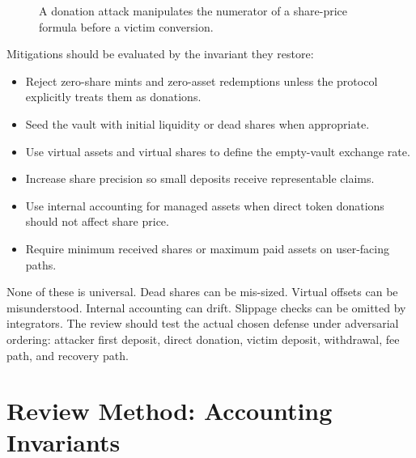 \begin{figure}[htbp]
\centering
{}
\caption{A donation attack manipulates the numerator of a share-price formula before a victim conversion.}
\end{figure}

Mitigations should be evaluated by the invariant they restore:

\begin{itemize}
\item Reject zero-share mints and zero-asset redemptions unless the protocol explicitly treats them as donations.
\item Seed the vault with initial liquidity or dead shares when appropriate.
\item Use virtual assets and virtual shares to define the empty-vault exchange rate.
\item Increase share precision so small deposits receive representable claims.
\item Use internal accounting for managed assets when direct token donations should not affect share price.
\item Require minimum received shares or maximum paid assets on user-facing paths.
\end{itemize}

None of these is universal. Dead shares can be mis-sized. Virtual offsets can be misunderstood. Internal accounting can drift. Slippage checks can be omitted by integrators. The review should test the actual chosen defense under adversarial ordering: attacker first deposit, direct donation, victim deposit, withdrawal, fee path, and recovery path.

\section{Review Method: Accounting Invariants}

